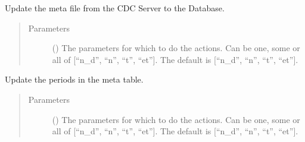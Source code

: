 \documentclass[letterpaper,10pt,english]{sphinxmanual}
\begin{document}
\begin{fulllineitems}
\begin{fulllineitems}
\begin{quote}
\begin{description}
\end{description}\end{quote}

\end{fulllineitems}


\begin{fulllineitems}
\label{\detokenize{weatherDB:weatherDB.broker.Broker.update_meta}}
\sphinxAtStartPar
Update the meta file from the CDC Server to the Database.
\begin{quote}\begin{description}
\item[{Parameters}] \leavevmode
\sphinxAtStartPar
{} (\sphinxstyleliteralemphasis{\sphinxupquote{, }}) \textendash{} The parameters for which to do the actions.
Can be one, some or all of {[}“n\_d”, “n”, “t”, “et”{]}.
The default is {[}“n\_d”, “n”, “t”, “et”{]}.

\end{description}\end{quote}

\end{fulllineitems}


\begin{fulllineitems}
\label{\detokenize{weatherDB:weatherDB.broker.Broker.update_period_meta}}
\sphinxAtStartPar
Update the periods in the meta table.
\begin{quote}\begin{description}
\item[{Parameters}] \leavevmode
\sphinxAtStartPar
{} (\sphinxstyleliteralemphasis{\sphinxupquote{, }}) \textendash{} The parameters for which to do the actions.
Can be one, some or all of {[}“n\_d”, “n”, “t”, “et”{]}.
The default is {[}“n\_d”, “n”, “t”, “et”{]}.


\end{description}
\end{quote}
\end{fulllineitems}
\end{fulllineitems}
\end{document}
